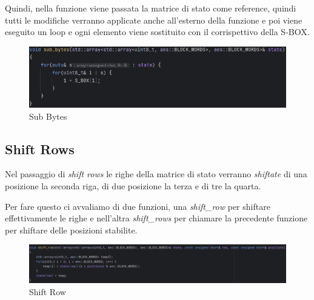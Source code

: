  

\textsf{\small Quindi, nella funzione viene passata la matrice di stato come reference, quindi tutti le modifiche verranno applicate anche all'esterno della funzione e poi viene eseguito un loop e ogni elemento viene sostituito con il corrispettivo della S-BOX.}

\begin{figure}[H]
	\centering
	\includegraphics[width=1\textwidth, height=1\textheight, keepaspectratio]{./images/code/cpp/encryption/sub_bytes.PNG}
	\caption{Sub Bytes}
	\label{fig:sub_bytes}
\end{figure}

\subsection{Shift Rows}


\textsf{\small Nel passaggio di \emph{shift rows} le righe della matrice di stato verranno \emph{shiftate} di una posizione la seconda riga, di due posizione la terza e di tre la quarta.}


\textsf{\small Per fare questo ci avvaliamo di due funzioni, una \emph{shift\_row} per shiftare effettivamente le righe e nell'altra \emph{shift\_rows} per chiamare la precedente funzione per shiftare delle posizioni stabilite.}


\begin{figure}[H]
	\centering
	\includegraphics[width=1\textwidth, height=1\textheight, keepaspectratio]{./images/code/cpp/encryption/shift_row.PNG}
	\caption{Shift Row}
	\label{fig:shift_row}
\end{figure}



